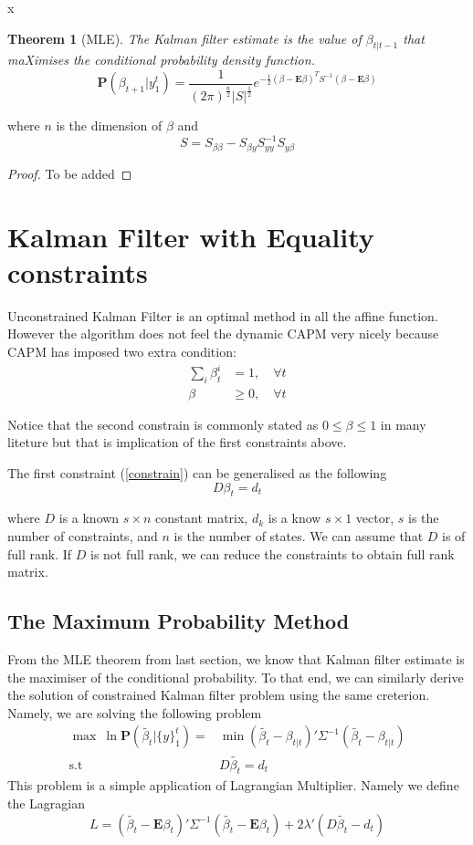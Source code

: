 \message{ !name(kalman_filter.tex)}x\documentclass{article}
\numberwithin{algorithm}{section}
\theoremstyle{plain}
\newtheorem{thm}{Theorem}[section]
\theoremstyle{definition}
\theoremstyle{remark}
\newcommand{\E}{\mathbf{E}}
\newcommand{\PP}{\mathbf{P}}
\begin{document}
\begin{thm}[MLE]
The Kalman filter estimate is the value of $\beta_{t|t-1}$ that maXimises the conditional probability density function.
\[
\PP(\beta_{t+1} | y_1^t) = \frac1{(2\pi)^\frac n2 |S|^{\frac12}} e^{-\frac12(\beta - \E \beta)^T S^{-1} (\beta - \E \beta)}
\]
\end{thm}
where $n$ is the dimension of $\beta$ and 
\[
S = S_{\beta \beta} - S_{\beta y} S^{-1}_{y y} S_{y\beta }
\] 
\begin{proof}
To be added
\end{proof}


\section{Kalman Filter with Equality constraints}

Unconstrained Kalman Filter is an optimal method in all the affine function. However the algorithm does not feel the dynamic CAPM very nicely because CAPM has imposed two extra condition:
\begin{equation}
\begin{split}
\sum_{i} \beta^i_t &= 1, \quad \forall t\\
\beta &\geq 0, \quad \forall t
\end{split}
\label{constrain}
\end{equation}

Notice that the second constrain is commonly stated as $0 \leq \beta \leq 1$ in many liteture but that is implication of the first constraints above. 

The first constraint (\ref{constrain}) can be generalised as the following 
\[
D \beta_t = d_t
\]

where $D$ is a known $s \times n$ constant matrix, $d_k$ is a know $s \times 1$ vector, $s$ is the number of constraints, and $n$ is the number of states. We can assume that $D$ is of full rank. If $D$ is not full rank, we can reduce the constraints to obtain full rank matrix.

\subsection{The Maximum Probability Method}
From the MLE theorem from last section, we know that Kalman filter estimate is the maximiser of the conditional probability. To that end, we can similarly derive the solution of constrained Kalman filter problem using the same creterion. Namely, we are solving the following problem
\begin{equation}
\begin{split}
\max \: \ln \PP(\tilde{\beta_t} | \{y\}^t_1) = &\min (\tilde{\beta_t}  - \beta_{t|t})' \Sigma^{-1} (\tilde{\beta_t}  - \beta_{t|t})\\
\text{s.t }&D\tilde{\beta_t} = d_t
\end{split}
\end{equation}
This problem is a  simple application of Lagrangian Multiplier. Namely we define the Lagragian
\[
L = (\tilde{\beta_t}  - \E{\beta_t})' \Sigma^{-1} (\tilde{\beta_t}  - \E{\beta_t}) + 2 \lambda' (D\tilde{\beta_t} - d_t)
\]
\end{document}
